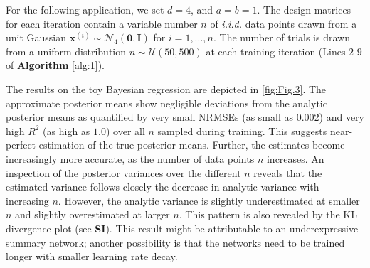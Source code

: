\documentclass[9pt,twoside,lineno]{pnas-new}
\begin{document}
For the following application, we set $d=4$, and $a=b=1$. The design matrices for each iteration contain a variable number $n$ of \textit{i.i.d.} data points drawn from a unit Gaussian $\boldsymbol{x}^{(i)} \sim \mathcal{N}_{4}(\boldsymbol{0},\boldsymbol{I})$ for $i=1,...,n$. The number of trials is drawn from a uniform distribution $n \sim \mathcal{U}(50, 500)$ at each training iteration (Lines $2$-$9$ of \textbf{Algorithm} \ref{alg:1}).

The results on the toy Bayesian regression are depicted in \autoref{fig:Fig.3}. The approximate posterior means show negligible deviations from the analytic posterior means as quantified by very small NRMSEs (as small as $0.002$) and very high $R^{2}$ (as high as $1.0$) over all $n$ sampled during training. This suggests near-perfect estimation of the true posterior means. Further, the estimates become increasingly more accurate, as the number of data points $n$ increases. An inspection of the posterior variances over the different $n$ reveals that the estimated variance follows closely the decrease in analytic variance with increasing $n$. However, the analytic variance is slightly underestimated at smaller $n$ and slightly overestimated at larger $n$. This pattern is also revealed by the KL divergence plot (see \textbf{SI}). This result might be attributable to an underexpressive summary network; another possibility is that the networks need to be trained longer with smaller learning rate decay. 
\end{document}

